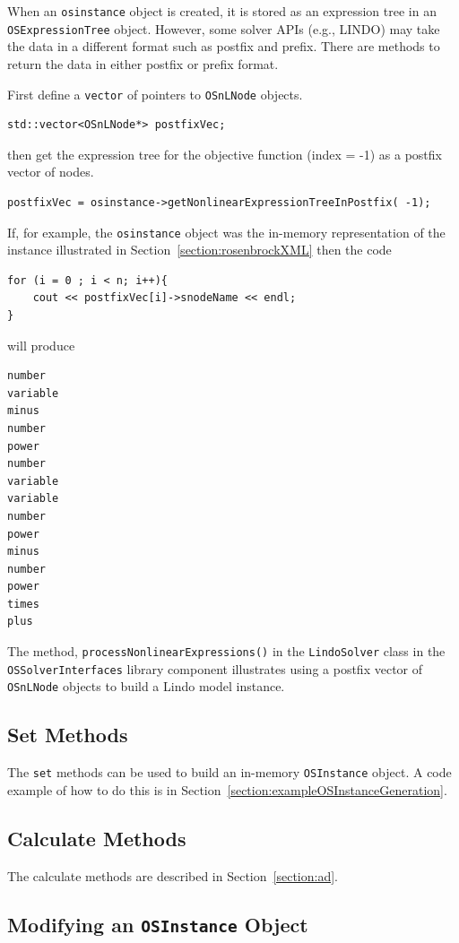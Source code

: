 \documentclass[11pt]{article}
\renewcommand{\_}{{\char"5F}}
\renewcommand{\{}{{\char"7B}}
\renewcommand{\}}{{\char"7D}}
\renewcommand{\^}{{\char"0D}}
\renewcommand{\'}{{\char"0D}}
\begin{document}
\begin{enumerate}[Step 1:]
When an {\tt osinstance} object is created, it is stored as an expression tree in an {\tt OSExpressionTree} object. 
However, some solver APIs (e.g., LINDO) may take the data in a different format such as postfix and prefix. 
There are methods to return the data in either postfix or prefix format.

First define a {\tt vector} of pointers to {\tt OSnLNode} objects.
\begin{verbatim}
std::vector<OSnLNode*> postfixVec;
\end{verbatim}
then get the expression tree for the objective function (index = -1) as a postfix vector of nodes.
\begin{verbatim}
postfixVec = osinstance->getNonlinearExpressionTreeInPostfix( -1);
\end{verbatim}
If, for example, the {\tt osinstance} object was the in-memory representation of   the instance illustrated in  Section~\ref{section:rosenbrockXML} then the code
\begin{verbatim}
for (i = 0 ; i < n; i++){
    cout << postfixVec[i]->snodeName << endl;
}
\end{verbatim}
will produce
\begin{verbatim}
number
variable
minus
number
power
number
variable
variable
number
power
minus
number
power
times
plus
\end{verbatim}
The method, {\tt processNonlinearExpressions()} in the {\tt LindoSolver} class in the {\tt OSSolverInterfaces} library component illustrates using a postfix vector of {\tt OSnLNode} objects to build a Lindo model instance.


\subsection{Set Methods}

The {\tt set} methods can be used to build an in-memory {\tt OSInstance}
 object. A code example of how to do this is in Section~\ref{section:exampleOSInstanceGeneration}.

\subsection{Calculate Methods}

The calculate methods are described in Section~\ref{section:ad}.


\subsection{Modifying an   {\tt OSInstance} Object}\label{section:osinstanceMod}


\end{enumerate}
\end{document}
